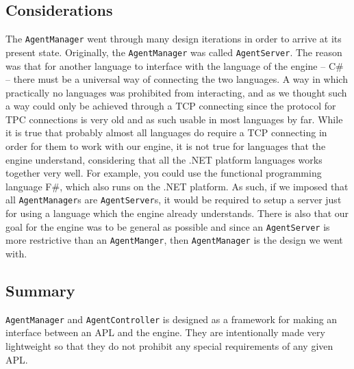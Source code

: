 \subsection*{Considerations}

The \texttt{AgentManager} went through many design iterations in order
to arrive at its present state. Originally, the \texttt{AgentManager}
was called \texttt{AgentServer}. The reason was that for another language
to interface with the language of the engine -- C\# -- there must
be a universal way of connecting the two languages. A way in which
practically no languages was prohibited from interacting, and as we
thought such a way could only be achieved through a TCP connecting
since the protocol for TPC connections is very old and as such usable
in most languages by far. While it is true that probably almost all
languages do require a TCP connecting in order for them to work with
our engine, it is not true for languages that the engine understand,
considering that all the .NET platform languages works together very
well. For example, you could use the functional programming language
F\#, which also runs on the .NET platform. As such, if we imposed
that all \texttt{AgentManager}s are \texttt{AgentServer}s, it would
be required to setup a server just for using a language which the
engine already understands. There is also that our goal for the engine
was to be general as possible and since an \texttt{AgentServer} is
more restrictive than an \texttt{AgentManger}, then \texttt{AgentManager}
is the design we went with.


\subsection*{Summary}

\texttt{AgentManager} and \texttt{AgentController} is designed as
a framework for making an interface between an APL and the engine.
They are intentionally made very lightweight so that they do not prohibit
any special requirements of any given APL.
